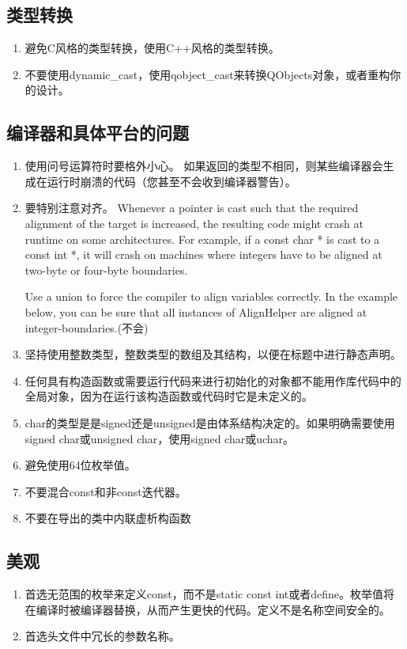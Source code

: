 \subsection{类型转换}
\begin{enumerate}
	\item 避免C风格的类型转换，使用C++风格的类型转换。
	\item 不要使用dynamic\_cast，使用qobject\_cast来转换QObjects对象，或者重构你的设计。
\end{enumerate}
\subsection{编译器和具体平台的问题}
\begin{enumerate}
	\item 使用问号运算符时要格外小心。 如果返回的类型不相同，则某些编译器会生成在运行时崩溃的代码（您甚至不会收到编译器警告）。
	\item 要特别注意对齐。 Whenever a pointer is cast such that the required alignment of the target is increased, the resulting code might crash at runtime on some architectures. For example, if a const char * is cast to a const int *, it will crash on machines where integers have to be aligned at two-byte or four-byte boundaries.
	
	Use a union to force the compiler to align variables correctly.
	In the example below, you can be sure that all instances of
	AlignHelper are aligned at integer-boundaries.(不会)
	\item 坚持使用整数类型，整数类型的数组及其结构，以便在标题中进行静态声明。
	\item 任何具有构造函数或需要运行代码来进行初始化的对象都不能用作库代码中的全局对象，因为在运行该构造函数或代码时它是未定义的。
	\item char的类型是是signed还是unsigned是由体系结构决定的。如果明确需要使用signed char或unsigned char，使用signed char或uchar。
	\item 避免使用64位枚举值。
	\item 不要混合const和非const迭代器。
	\item 不要在导出的类中内联虚析构函数
\end{enumerate}
\subsection{美观}
\begin{enumerate}
	\item 首选无范围的枚举来定义const，而不是static const int或者define。枚举值将在编译时被编译器替换，从而产生更快的代码。定义不是名称空间安全的。
	\item 首选头文件中冗长的参数名称。
\end{enumerate}
